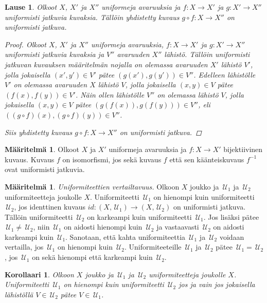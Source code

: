 \documentclass[12pt,a4paper,leqno]{report}
\newcommand{\U}{\,\mathcal{U}}
\theoremstyle{plain}
\newtheorem{lause}[equation]{Lause}
\newtheorem{kor}[equation]{Korollaari}
\theoremstyle{definition}
\newtheorem{maar}[equation]{Määritelmä}
\theoremstyle{remark}
\begin{document}
\begin{lause}
Olkoot $X$, $X'$ ja $X''$ uniformeja avaruuksia 
ja $f\colon X\rightarrow X'$ ja $g\colon X'\rightarrow X''$ uniformisti jatkuvia kuvaksia. 
Tällöin yhdistetty kuvaus $g\circ f\colon X\rightarrow X''$ on uniformisti jatkuva.
\begin{proof}
Olkoot $X$, $X'$ ja $X''$ uniformeja avaruuksia, 
$f\colon X\rightarrow X'$ ja $g\colon X'\rightarrow X''$ uniformisti jatkuvia kuvaksia ja 
$V''$ avaruuden $X''$ lähistö. 
Tällöin uniformisti jatkuvan kuvauksen määritelmän nojalla 
on olemassa avaruuden $X'$ lähistö $V'$, 
jolla jokaisella $(x',y')\in V'$ pätee $ (g(x'),g(y'))\in V''$.
Edelleen lähistölle $V'$ on olemassa avaruuden $X$ lähistö $V$, 
jolla jokaisella $(x,y)\in V$ pätee $ (f(x),f(y))\in V'$.
Näin ollen lähistölle $V''$ on olemassa lähistö $V$, 
jolla jokaisella $(x,y)\in V$ pätee $ (g(f(x)),g(f(y)))\in V''$, 
eli $ ((g\circ f)(x),(g\circ f)(y))\in V''$.

Siis yhdistetty kuvaus $g\circ f\colon X\rightarrow X''$ on uniformisti jatkuva.
\end{proof}
\end{lause}
\begin{maar}
Olkoot $X$ ja $X'$ uniformeja avaruuksia 
ja $f\colon X\rightarrow X'$ bijektiivinen kuvaus. Kuvaus $f$ on isomorfismi, jos sekä kuvaus $f$ että sen käänteiskuvaus $f^{-1}$ ovat uniformisti jatkuvia.
\end{maar}
\begin{maar}\label{uniformi_vertailu}
\emph{Uniformiteettien vertailtavuus.} 
Olkoon $X$ joukko ja $\U_1$ ja $\U_2$ uniformiteetteja joukolle $X$. 
Uniformiteetti $\U_1$ on hienompi kuin uniformiteetti $\U_2$, 
jos identtinen kuvaus $id\colon (X,\U_1)\rightarrow (X,\U_2)$ on uniformisti jatkuva. Tällöin uniformiteetti $\U_2$ on karkeampi kuin uniformiteetti $\U_1$. 
Jos lisäksi pätee $\U_1\neq\U_2$, niin $\U_1$ on aidosti hienompi kuin $\U_2$ ja vastaavasti $\U_2$ on aidosti karkeampi kuin $\U_1$. 
Sanotaan, että kahta uniformiteettia $\U_1$ ja $\U_2$ voidaan vertailla, jos $\U_1$ on hienompi kuin $\U_2$. 
Uniformiteeteille $\U_1$ ja $\U_2$ pätee $\U_1=\U_2$, 
jos $\U_1$ on sekä hienompi että karkeampi kuin $\U_2$.
\end{maar}
\begin{kor}
Olkoon $X$ joukko ja $\U_1$ ja $\U_2$ uniformiteetteja joukolle $X$. 
Uniformiteetti $\U_1$ on hienompi kuin uniformiteetti $\U_2$ jos ja vain jos jokaisella lähistöllä $V\in\U_2$ pätee $V\in\U_1$.
\end{kor}
\end{document}
